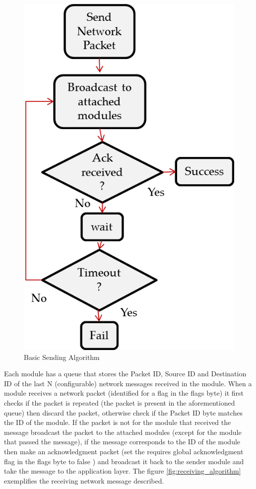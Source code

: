 \begin{figure}[htb]
\centering
\includegraphics[scale = 0.7]{figures/send_algorithm.png}
\caption{Basic Sending Algorithm}
\label{fig:sending_algorithm}
\end{figure}

Each module has a queue that stores the Packet ID, Source ID and Destination ID of the last N (configurable) network messages received in the module. When a module receives a network packet (identified for a flag in the flags byte) it first checks if the packet is repeated (the packet is present in the aforementioned queue) then discard the packet, otherwise check if the Packet ID byte matches the ID of the module. If the packet is not for the module that received the message broadcast the packet to the attached modules (except for the module that passed the message), if the message corresponds to the ID of the module then make an acknowledgment packet (set the requires global acknowledgment flag in the flags byte to false ) and broadcast it back to the sender module and take the message to the application layer. The figure \ref{fig:receiving_algorithm} exemplifies the receiving network message described.

